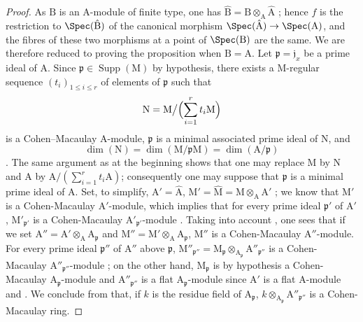 \begin{proof}
As $\mathrm{B}$ is an $\mathrm{A}$-module of finite type, one has $\hat{\mathrm{B}}=\mathrm{B}\otimes_\mathrm{A}\hat{\mathrm{A}}$ ; hence $f$ is the restriction to $\Spec(\hat{\mathrm{B}})$ of the canonical morphism $\Spec(\hat{\mathrm{A}})\to\Spec(\mathrm{A})$, and the fibres of these two morphisms at a point of $\Spec(\mathrm{B})$ are the same.
We are therefore reduced to proving the proposition when $\mathrm{B}=\mathrm{A}$.
Let $\mathfrak{p}=\mathfrak{j}_x$ be a prime ideal of $\mathrm{A}$. Since $\mathfrak{p}\in\operatorname{Supp}(\mathrm{M})$ by hypothesis, there exists  a $\mathrm{M}$-regular sequence $(t_i)_{1\leqslant i\leqslant r}$ of elements of $\mathfrak{p}$ such that
\[
 \mathrm{N}=\mathrm{M}\big/\Bigl(\sum_{i=1}^r t_i\mathrm{M}\Bigr)
\]
is a Cohen--Macaulay $\mathrm{A}$-module, $\mathfrak{p}$ is a minimal associated prime ideal of $\mathrm{N}$, and
\[
 \dim(\mathrm{N})=\dim(\mathrm{M}/\mathfrak{p}\mathrm{M})=\dim(\mathrm{A}/\mathfrak{p})
\]
. The same argument as at the beginning shows that one may replace $\mathrm{M}$ by $\mathrm{N}$ and $\mathrm{A}$ by $\mathrm{A}/(\sum_{i=1}^r t_i\mathrm{A})$; consequently one may suppose that $\mathfrak{p}$ is a minimal prime ideal of $\mathrm{A}$.
Set, to simplify, $\mathrm{A}'=\hat{\mathrm{A}}$, $\mathrm{M}'=\hat{\mathrm{M}}=\mathrm{M}\otimes_\mathrm{A}\mathrm{A}'$ ; we know  that $\mathrm{M}'$ is a Cohen-Macaulay $\mathrm{A}'$-module, which implies that for every prime ideal $\mathfrak{p}'$ of $\mathrm{A}'$, $\mathrm{M}'_{\mathfrak{p}'}$ is a Cohen-Macaulay $\mathrm{A}'_{\mathfrak{p}'}$-module .
Taking into account , one sees that if we set $\mathrm{A}''=\mathrm{A}'\otimes_\mathrm{A}\mathrm{A}_\mathfrak{p}$ and $\mathrm{M}''=\mathrm{M}'\otimes_\mathrm{A}\mathrm{A}_\mathfrak{p}$, $\mathrm{M}''$ is a Cohen-Macaulay $\mathrm{A}''$-module.
For every prime ideal $\mathfrak{p}''$ of $\mathrm{A}''$ above $\mathfrak{p}$, $\mathrm{M}''_{\mathfrak{p}''}=\mathrm{M}_\mathfrak{p}\otimes_{\mathrm{A}_\mathfrak{p}}\mathrm{A}''_{\mathfrak{p}''}$ is a Cohen-Macaulay $\mathrm{A}''_{\mathfrak{p}''}$-module ; on the other hand, $\mathrm{M}_\mathfrak{p}$ is by hypothesis a Cohen-Macaulay $\mathrm{A}_\mathfrak{p}$-module and $\mathrm{A}''_{\mathfrak{p}''}$ is a flat $\mathrm{A}_\mathfrak{p}$-module since $\mathrm{A}'$ is a flat $\mathrm{A}$-module  and .
We conclude from  that, if $k$ is the residue field of $\mathrm{A}_\mathfrak{p}$, $k\otimes_{\mathrm{A}_\mathfrak{p}}\mathrm{A}''_{\mathfrak{p}''}$ is a Cohen-Macaulay ring.

\end{proof}
